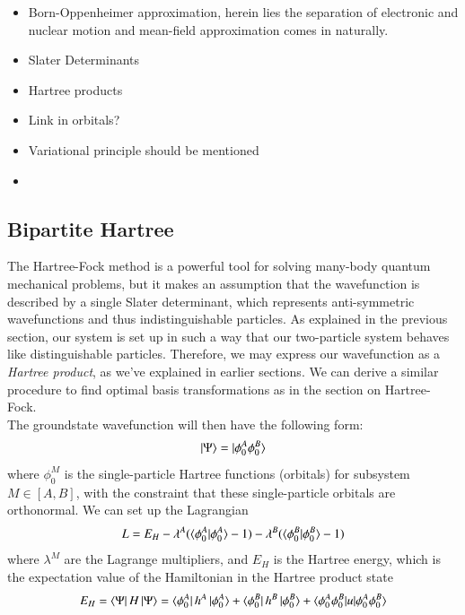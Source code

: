 \documentclass{subfiles}
\begin{document}
\begin{itemize}
    \item Born-Oppenheimer approximation, herein lies the separation of electronic and nuclear motion and mean-field approximation comes in naturally.
    \item Slater Determinants
    \item Hartree products
    \item Link in orbitals?
    \item Variational principle should be mentioned
    \item 
\end{itemize}

\subsection*{Bipartite Hartree}\label{sec:bipartite_H}
The Hartree-Fock method is a powerful tool for solving many-body quantum mechanical problems, but it makes an assumption that the wavefunction is described by a single Slater determinant, which represents anti-symmetric wavefunctions and thus indistinguishable particles. As explained in the previous section, our system is set up in such a way that our two-particle system behaves like distinguishable particles. Therefore, we may express our wavefunction as a \emph{Hartree product}, as we've explained in earlier sections. We can derive a similar procedure to find optimal basis transformations as in the section on Hartree-Fock. \\
The groundstate wavefunction will then have the following form:
\begin{align*}
    \ket{\Psi} = \ket{\phi^A_0\phi^B_0}
\end{align*}
where $\phi_0^M$ is the single-particle Hartree functions (orbitals) for subsystem $M\in[A,B]$, with the constraint that these single-particle orbitals are orthonormal. We can set up the Lagrangian
\begin{align*}
    L = E_H - \lambda^A(\braket{\phi^A_0|\phi^A_0} - 1) - \lambda^B(\braket{\phi^B_0|\phi^B_0} - 1)
\end{align*}
where $\lambda^M$ are the Lagrange multipliers, and $E_H$ is the Hartree energy, which is the expectation value of the Hamiltonian in the Hartree product state
\begin{align*}
    E_H = \bra{\Psi}H\ket{\Psi} = \bra{\phi^A_0}h^A\ket{\phi^A_0} + \bra{\phi^B_0}h^B\ket{\phi^B_0} + \braket{\phi^A_0\phi^B_0|u|\phi^A_0\phi^B_0}
\end{align*}
\end{document}
